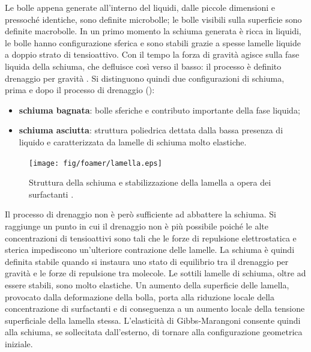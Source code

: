 Le bolle appena generate all'interno del liquidi, dalle piccole dimensioni e pressoché identiche, sono definite microbolle; le bolle visibili sulla superficie sono definite macrobolle. In un primo momento la schiuma generata è ricca in liquidi, le bolle hanno configurazione sferica e sono stabili grazie a spesse lamelle liquide a doppio strato di tensioattivo. Con il tempo la forza di gravità agisce sulla fase liquida della schiuma, che defluisce così verso il basso: il processo è definito drenaggio per gravità \parencite{tego2014brochure}. Si distinguono quindi due configurazioni di schiuma, prima e dopo il processo di drenaggio ():
\begin{itemize}
    \item \textbf{schiuma bagnata}: bolle sferiche e contributo importante della fase liquida;
    \item \textbf{schiuma asciutta}: struttura poliedrica dettata dalla bassa presenza di liquido e caratterizzata da lamelle di schiuma molto elastiche.
\end{itemize}

\begin{figure}[htbp]
    \centering
    \texttt{[image: fig/foamer/lamella.eps]}
    \caption{Struttura della schiuma e stabilizzazione della lamella a opera dei surfactanti \parencite{tego2014brochure}.}
    \label{fig:lamella}
\end{figure}

Il processo di drenaggio non è però sufficiente ad abbattere la schiuma. Si raggiunge un punto in cui il drenaggio non è più possibile poiché le alte concentrazioni di tensioattivi sono tali che le forze di repulsione elettrostatica e sterica impediscono un'ulteriore contrazione delle lamelle. La schiuma è quindi definita stabile quando si instaura uno stato di equilibrio tra il drenaggio per gravità e le forze di repulsione tra molecole.
Le sottili lamelle di schiuma, oltre ad essere stabili, sono molto elastiche. Un aumento della superficie delle lamella, provocato dalla deformazione della bolla, porta alla riduzione locale della concentrazione di surfactanti e di conseguenza a un aumento locale della tensione superficiale della lamella stessa. L'elasticità di Gibbs-Marangoni consente quindi alla schiuma, se sollecitata dall'esterno, di tornare alla configurazione geometrica iniziale.

